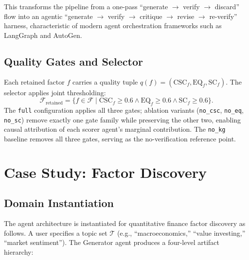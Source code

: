 \documentclass[sigconf]{acmart}
\begin{document}
This transforms the pipeline from a one-pass ``generate $\rightarrow$ verify $\rightarrow$ discard'' flow into an agentic ``generate $\rightarrow$ verify $\rightarrow$ critique $\rightarrow$ revise $\rightarrow$ re-verify'' harness, characteristic of modern agent orchestration frameworks such as LangGraph and AutoGen.

\subsection{Quality Gates and Selector}

Each retained factor $f$ carries a quality tuple $q(f) = (\text{CSC}_f, \text{EQ}_f, \text{SC}_f)$. The selector applies joint thresholding:
\[
\mathcal{F}_{\text{retained}} = \{f \in \mathcal{F} \mid \text{CSC}_f \geq 0.6 \land \text{EQ}_f \geq 0.6 \land \text{SC}_f \geq 0.6\}.
\]
The \texttt{full} configuration applies all three gates; ablation variants (\texttt{no\_csc}, \texttt{no\_eq}, \texttt{no\_sc}) remove exactly one gate family while preserving the other two, enabling causal attribution of each scorer agent's marginal contribution. The \texttt{no\_kg} baseline removes all three gates, serving as the no-verification reference point.

\section{Case Study: Factor Discovery}

\subsection{Domain Instantiation}

The agent architecture is instantiated for quantitative finance factor discovery as follows. A user specifies a topic set $\mathcal{T}$ (e.g., ``macroeconomics,'' ``value investing,'' ``market sentiment''). The Generator agent produces a four-level artifact hierarchy:
\end{document}
